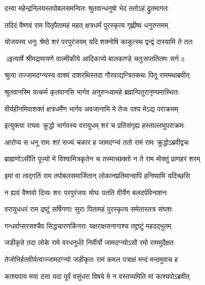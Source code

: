 \twolineshloka
{दत्त्वा महेन्द्रनिलयस्तपोबलसमन्वितः}
{श्रुतवान्धनुषो भेदं ततोऽहं द्रुतमागतः} %

\twolineshloka
{तदिदं वैष्णवं राम पितृपैतामहं महत्}
{क्षत्रधर्मं पुरस्कृत्य गृह्णीष्व धनुरुत्तमम्} %

\twolineshloka
{योजयस्व धनुः श्रेष्ठे शरं परपुरंजयम्}
{यदि शक्नोषि काकुत्स्थ द्वन्द्वं दास्यामि ते ततः} %


{॥इत्यार्षे श्रीमद्रामायणे वाल्मीकीये आदिकाव्ये बालकाण्डे चतुःसप्ततितमः सर्गः॥}


\twolineshloka
{श्रुत्वा तज्जामदग्न्यस्य वाक्यं दाशरथिस्तदा}
{गौरवाद्यन्त्रितकथः पितू राममथाब्रवीत्} %

\twolineshloka
{श्रुतवानस्मि यत्कर्म कृतवानसि भार्गव}
{अनुरुन्ध्यामहे ब्रह्मन्पितुरानृण्यमास्थितः} %

\twolineshloka
{वीर्यहीनमिवाशक्तं क्षत्रधर्मेण भार्गव}
{अवजानामि मे तेजः पश्य मेऽद्य पराक्रमम्} %

\twolineshloka
{इत्युक्त्वा राघवः क्रुद्धो भार्गवस्य वरायुधम्}
{शरं च प्रतिसंगृह्य हस्ताल्लघुपराक्रमः} %

\twolineshloka
{आरोप्य स धनू रामः शरं सज्यं चकार ह}
{जामदग्न्यं ततो रामं रामः क्रुद्धोऽब्रवीद्वचः} %

\twolineshloka
{ब्राह्मणोऽसीति पूज्यो मे विश्वामित्रकृतेन च}
{तस्माच्छक्तो न ते राम मोक्तुं प्राणहरं शरम्} %

\twolineshloka
{इमां वा त्वद्गतिं राम तपोबलसमार्जितान्}
{लोकानप्रतिमान्वापि हनिष्यामि यदिच्छसि} %

\twolineshloka
{न ह्ययं वैष्णवो दिव्यः शरः परपुरंजयः}
{मोघः पतति वीर्येण बलदर्पविनाशनः} %

\twolineshloka
{वरायुधधरं राम द्रष्टुं सर्षिगणाः सुराः}
{पितामहं पुरस्कृत्य समेतास्तत्र संघशः} %

\twolineshloka
{गन्धर्वाप्सरसश्चैव सिद्धचारणकिंनराः}
{यक्षराक्षसनागाश्च तद्द्रष्टुं महदद्भुतम्} %

\twolineshloka
{जडीकृते तदा लोके रामे वरधनुर्धरे}
{निर्वीर्यो जामदग्न्योऽसौ रमो राममुदैक्षत} %

\twolineshloka
{तेजोभिर्हतवीर्यत्वाज्जामदग्न्यो जडीकृतः}
{रामं कमल पत्राक्षं मन्दं मन्दमुवाच ह} %

\twolineshloka
{काश्यपाय मया दत्ता यदा पूर्वं वसुंधरा}
{विषये मे न वस्तव्यमिति मां काश्यपोऽब्रवीत्} %

